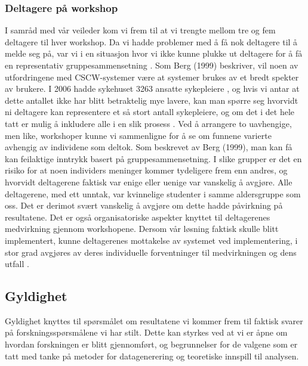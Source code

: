 \subsubsection{Deltagere på workshop}
I samråd med vår veileder kom vi frem til at vi trengte mellom tre og fem deltagere til hver workshop. Da vi hadde problemer med å få nok deltagere til å melde seg på, var vi i en situasjon hvor vi ikke kunne plukke ut deltagere for å få en representativ gruppesammensetning \cite{Seland, Cavaye95}. Som Berg (1999) beskriver, vil noen av utfordringene med CSCW-systemer være at systemer brukes av et bredt spekter av brukere. I 2006 hadde sykehuset 3263 ansatte sykepleiere \cite{nokkeltall}, og hvis vi antar at dette antallet ikke har blitt betraktelig mye lavere, kan man spørre seg hvorvidt ni deltagere kan representere et så stort antall sykepleiere, og om det i det hele tatt er mulig å inkludere alle i en slik prosess \cite{Cavaye95}. Ved å arrangere to uavhengige, men like, workshoper kunne vi sammenligne for å se om funnene varierte avhengig av individene som deltok. Som beskrevet av Berg (1999), man kan få kan feilaktige inntrykk basert på gruppesammensetning. I slike grupper er det en risiko for at noen individers meninger kommer tydeligere frem enn andres, og hvorvidt deltagerene faktisk var enige eller uenige var vanskelig å avgjøre. Alle deltagerene, med ett unntak, var kvinnelige studenter i samme aldersgruppe som oss. Det er derimot svært vanskelig å avgjøre om dette hadde påvirkning på resultatene. Det er også organisatoriske aspekter knyttet til deltagerenes medvirkning gjennom workshopene. Dersom vår løsning faktisk skulle blitt implementert, kunne deltagerenes mottakelse av systemet ved implementering, i stor grad avgjøres av deres individuelle forventninger til medvirkningen og dens utfall \cite{Jacobsen12, Cavaye95}. 

\subsection{Gyldighet}
Gyldighet knyttes til spørsmålet om resultatene vi kommer frem til faktisk svarer på forskningsspørsmålene vi har stilt. Dette kan styrkes ved at vi er åpne om hvordan forskningen er blitt gjennomført, og begrunnelser for de valgene som er tatt med tanke på metoder for datagenerering og teoretiske innspill til analysen. 

